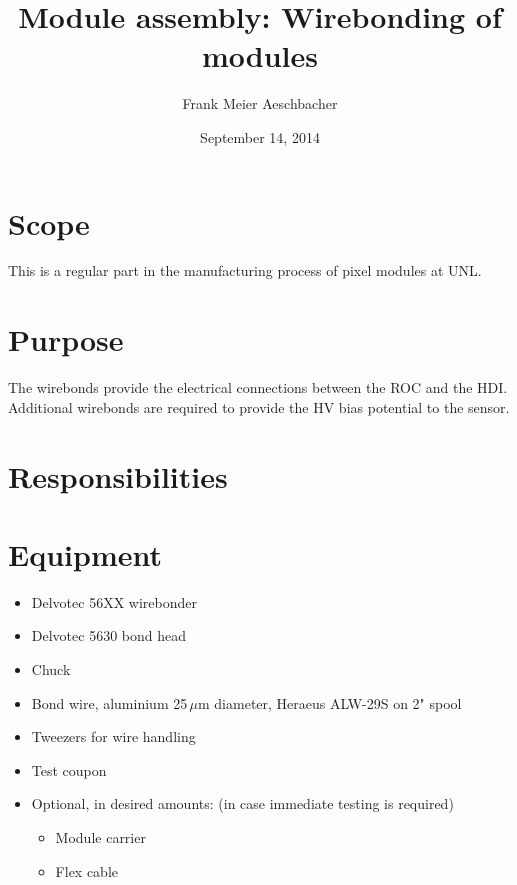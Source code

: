 \documentclass[12pt]{unlsilabsop}
\title{Module assembly: Wirebonding of modules}
\date{September 14, 2014}
\author{Frank Meier Aeschbacher}
\begin{document}
\maketitle

\section{Scope}
This is a regular part in the manufacturing process of pixel modules at UNL.

\section{Purpose}
The wirebonds provide the electrical connections between the ROC and the HDI. Additional wirebonds are required to provide the HV bias potential to the sensor.


\section{Responsibilities}

\section{Equipment}

\begin{itemize}
    \item Delvotec 56XX wirebonder
    \item Delvotec 5630 bond head
    \item Chuck
    \item Bond wire, aluminium 25\,$\mu$m diameter, Heraeus ALW-29S on 2" spool
    \item Tweezers for wire handling
    \item Test coupon
    \item Optional, in desired amounts: (in case immediate testing is required)
    \begin{itemize}
	\item Module carrier
	\item Flex cable
    \end{itemize}
\end{itemize}
\end{document}

